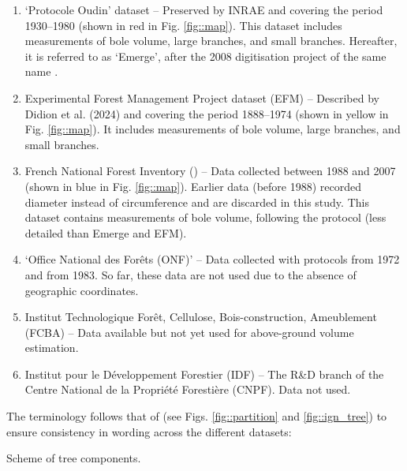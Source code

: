 \begin{enumerate}
	\item `Protocole Oudin' dataset -- Preserved by INRAE and covering the period 1930--1980 (shown in red in Fig. \ref{fig::map}). This dataset includes measurements of bole volume, large branches, and small branches. Hereafter, it is referred to as `Emerge', after the 2008 digitisation project of the same name \parencite{Deleuze2013}.
	\item Experimental Forest Management Project dataset (EFM) -- Described by Didion et al. (2024) and covering the period 1888--1974 (shown in yellow in Fig. \ref{fig::map}). It includes measurements of bole volume, large branches, and small branches.
	\item French National Forest Inventory (\NFI) -- Data collected between 1988 and 2007 (shown in blue in Fig. \ref{fig::map}). Earlier data (before 1988) recorded diameter instead of circumference and are discarded in this study. This dataset contains measurements of bole volume, following the \NFI{} protocol (less detailed than Emerge and EFM).
	\item `Office National des Forêts (ONF)' -- Data collected with protocols from 1972 and from 1983. So far, these data are not used due to the absence of geographic coordinates.
	\item Institut Technologique Forêt, Cellulose, Bois-construction, Ameublement (FCBA) -- Data available but not yet used for above-ground volume estimation.
	\item Institut pour le Développement Forestier (IDF) -- The R\&D branch of the Centre National de la Propriété Forestière (CNPF). Data not used.
\end{enumerate}

The terminology follows that of \cite{Gschwantner2009} (see Figs. \ref{fig::partition} and \ref{fig::ign_tree}) to ensure consistency in wording across the different datasets:

\begin{marginfigure}
	
	\caption{Scheme of tree components.\label{fig::ign_tree}}
\end{marginfigure}

